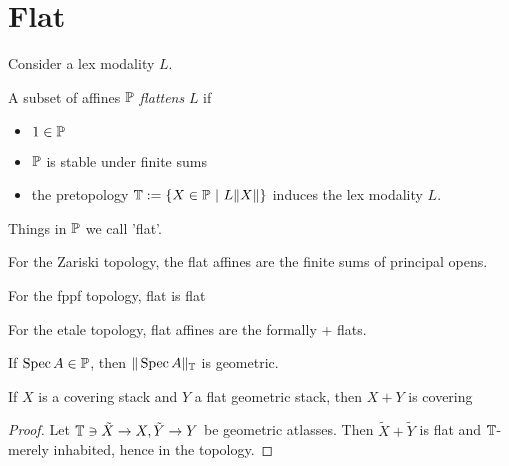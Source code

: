 \section{Flat}
Consider a lex modality $L$.
\begin{definition}
	A subset of affines $\mathbb{P}$ \emph{flattens} $L$ if
	\begin{itemize}
		\item $1 \in \mathbb{P}$
		\item $\mathbb{P}$ is stable under finite sums
		\item 	 the pretopology $\bT := \{ X \in \bP \ | \ L \| X \| \}$ induces the lex modality $L$.
	\end{itemize}
	
\end{definition}

Things in $\mathbb{P}$ we call 'flat'.
\begin{example}
	For the Zariski topology, the flat affines are the finite sums of principal opens.
\end{example}
\begin{example}
	For the fppf topology, flat is flat
\end{example}
\begin{example}
	For the etale topology, flat affines are the formally \etale + flats.
\end{example}
\begin{lemma}
	If $\operatorname{Spec} A \in \mathbb{P}$, then $\| \operatorname{Spec} A\|_{\mathbb{T}}$ is geometric.
\end{lemma}
\begin{lemma}
	If $X$ is a covering stack and $Y$ a flat geometric stack, then $X + Y$ is covering
\end{lemma}
\begin{proof}
	Let $\mathbb{T} \ni \tilde X \to X, \tilde Y \to Y$ be geometric atlasses. Then $\tilde X+ \tilde Y$ is flat and $\mathbb{T}$-merely inhabited, hence in the topology.
\end{proof}


